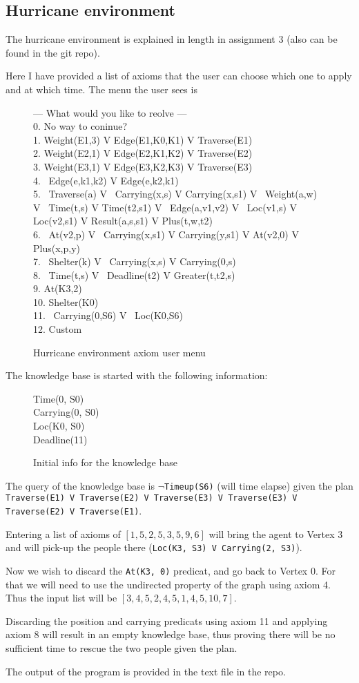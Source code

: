 \documentclass{article}                     %
\begin{document}
	\subsection{Hurricane environment}
	The hurricane environment is explained in length in assignment 3 (also can be found in the git repo).
	
	Here I have provided a list of axioms that the user can choose which one to apply and at which time. The menu the user sees is
	
	\begin{figure}[H]
		 --- What would you like to reolve --- \\
		0. No way to coninue? \\
		1. Weight(E1,3) V Edge(E1,K0,K1) V Traverse(E1)\\
		2. Weight(E2,1) V Edge(E2,K1,K2) V Traverse(E2)\\
		3. Weight(E3,1) V Edge(E3,K2,K3) V Traverse(E3)\\
		4. ~Edge(e,k1,k2) V Edge(e,k2,k1)\\
		5. ~Traverse(a) V ~Carrying(x,s) V Carrying(x,s1) V ~Weight(a,w) V ~Time(t,s) V Time(t2,s1) V ~Edge(a,v1,v2) V ~Loc(v1,s) V Loc(v2,s1) V Result(a,s,s1) V Plus(t,w,t2)\\
		6. ~At(v2,p) V ~Carrying(x,s1) V Carrying(y,s1) V At(v2,0) V Plus(x,p,y)\\
		7. ~Shelter(k) V ~Carrying(x,s) V Carrying(0,s)\\
		8. ~Time(t,s) V ~Deadline(t2) V Greater(t,t2,s)\\
		9. At(K3,2)\\
		10. Shelter(K0)\\
		11. ~Carrying(0,S6) V ~Loc(K0,S6)\\
		12. Custom
		\caption{Hurricane environment axiom user menu}
	\end{figure}

	The knowledge base is started with the following information:
	\begin{figure}[H]
		Time(0, S0)\\
		Carrying(0, S0)\\
		Loc(K0, S0)\\
		Deadline(11)
				\caption{Initial info for the knowledge base}
	\end{figure}
	The query of the knowledge base is $ \neg$\texttt{Timeup(S6)} (will time elapse) given the plan \texttt{Traverse(E1) V Traverse(E2) V Traverse(E3) V Traverse(E3) V Traverse(E2) V Traverse(E1)}.
	
	Entering a list of axioms of $ [1, 5, 2, 5, 3, 5, 9, 6] $ will bring the agent to Vertex 3 and will pick-up the people there (\texttt{Loc(K3, S3) V Carrying(2, S3)}).
	
	Now we wish to discard the \texttt{At(K3, 0)} predicat, and go back to Vertex 0. For that we will need to use the undirected property of the graph using axiom 4. Thus the input list will be $ [3, 4, 5, 2, 4, 5, 1, 4, 5, 10, 7] $.
	
	Discarding the position and carrying predicats using axiom 11 and applying axiom 8 will result in an empty knowledge base, thus proving there will be no sufficient time to rescue the two people given the plan. 
	
	The output of the program is provided in the text file in the repo. 
	
\end{document}
